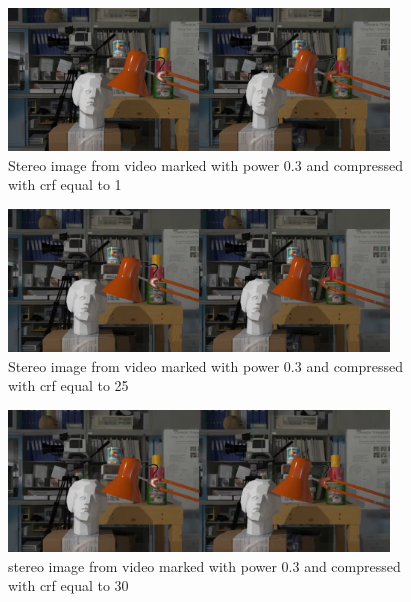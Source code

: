 \begin{figure}[h!]
\centering
\includegraphics[width=0.9\textwidth]{./img/03_crf1_gt.png}
\caption{\small{Stereo image from video marked with power 0.3 and compressed with crf equal to 1 }}
\label{fig:03crf1}
\end{figure}
\begin{figure}[h!]
\centering
\includegraphics[width=0.9\textwidth]{./img/03_crf25_gt.png}
\caption{\small{Stereo image from video marked with power 0.3 and compressed with crf equal to 25 }}
\label{fig:03crf25}
\end{figure}
\begin{figure}[h!]
\centering
\includegraphics[width=0.9\textwidth]{./img/03_crf30_gt.png}
\caption{\small{stereo image from video marked with power 0.3 and compressed with crf equal to 30 }}
\label{fig:03crf30}
\end{figure}


